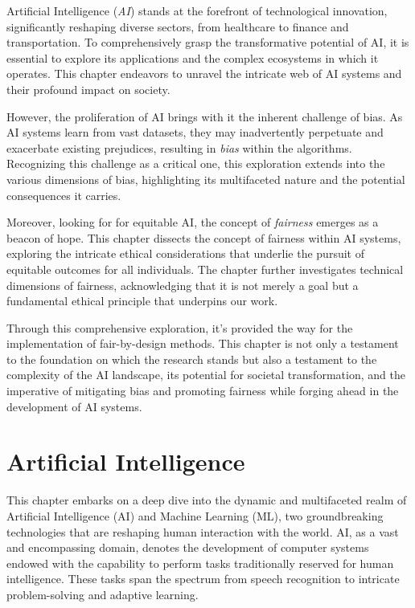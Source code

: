 \documentclass[12pt,a4paper,openright,twoside]{book}
\begin{document}
Artificial Intelligence (\emph{AI}) stands at the forefront of technological innovation, significantly reshaping diverse sectors, from healthcare to finance and transportation. To comprehensively grasp the transformative potential of AI, it is essential to explore its applications and the complex ecosystems in which it operates. This chapter endeavors to unravel the intricate web of AI systems and their profound impact on society.

However, the proliferation of AI brings with it the inherent challenge of bias. As AI systems learn from vast datasets, they may inadvertently perpetuate and exacerbate existing prejudices, resulting in \emph{bias} within the algorithms. Recognizing this challenge as a critical one, this exploration extends into the various dimensions of bias, highlighting its multifaceted nature and the potential consequences it carries. 

Moreover, looking for for equitable AI, the concept of \emph{fairness} emerges as a beacon of hope. This chapter dissects the concept of fairness within AI systems, exploring the intricate ethical considerations that underlie the pursuit of equitable outcomes for all individuals. The chapter further investigates technical dimensions of fairness, acknowledging that it is not merely a goal but a fundamental ethical principle that underpins our work. 

Through this comprehensive exploration, it's provided the way for the implementation of fair-by-design methods. This chapter is not only a testament to the foundation on which the research stands but also a testament to the complexity of the AI landscape, its potential for societal transformation, and the imperative of mitigating bias and promoting fairness while forging ahead in the development of AI systems. 


\section{Artificial Intelligence}

This chapter embarks on a deep dive into the dynamic and multifaceted realm of Artificial Intelligence (AI) and Machine Learning (ML), two groundbreaking technologies that are reshaping human interaction with the world. AI, as a vast and encompassing domain, denotes the development of computer systems endowed with the capability to perform tasks traditionally reserved for human intelligence. These tasks span the spectrum from speech recognition to intricate problem-solving and adaptive learning. 
\end{document}
